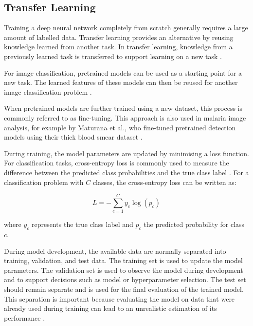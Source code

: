 \subsection{Transfer Learning}


Training a deep neural network completely from scratch generally requires a large amount of labelled data. Transfer learning provides an alternative by reusing knowledge learned from another task. In transfer learning, knowledge from a previously learned task is transferred to support learning on a new task \cite{PanYang2010}.

For image classification, pretrained models can be used as a starting point for a new task. The learned features of these models can then be reused for another image classification problem \cite{Rajaraman2018}.

When pretrained models are further trained using a new dataset, this process is commonly referred to as fine-tuning. This approach is also used in malaria image analysis, for example by Maturana et al., who fine-tuned pretrained detection models using their thick blood smear dataset \cite{Maturana2023}.

{\color{blue}  
During training, the model parameters are updated by minimising a loss function. For classification tasks, cross-entropy loss is commonly used to measure the difference between the predicted class probabilities and the true class label \cite{Goodfellow-et-al-2016}. For a classification problem with \(C\) classes, the cross-entropy loss can be written as:

\begin{equation}
L = -\sum_{c=1}^{C} y_c \log(p_c)
\label{eq:cross_entropy}
\end{equation}

where \(y_c\) represents the true class label and \(p_c\) the predicted probability for class \(c\).

During model development, the available data are normally separated into training, validation, and test data. The training set is used to update the model parameters. The validation set is used to observe the model during development and to support decisions such as model or hyperparameter selection. The test set should remain separate and is used for the final evaluation of the trained model. This separation is important because evaluating the model on data that were already used during training can lead to an unrealistic estimation of its performance \cite{Goodfellow-et-al-2016}.
}


